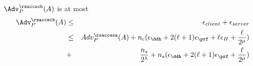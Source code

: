 \begin{lemma} \label{lemma:quic_tls_rsacce-cb}
 $\Adv^{\rsaccecb}_{P}(A)$ is at most
 \begin{eqnarray}
  \Adv^{\rsaccecb}_{P}(A) &\leq& \epsilon_{client} + \epsilon_{server} \nonumber \\
  &\leq& Adv^{\rsaccesa}_{P}(A) + n_c(\epsilon_{\ddh} + 2(\ell + 1)\epsilon_{\prf} + \ell\epsilon_{H} + \frac{\ell}{2^{\mu}}) \nonumber \\
   &+& \frac{n_s}{2^{\lambda}} + n_s(\epsilon_{\ddh} + 2(\ell+1)\epsilon_{\prf} + \frac{\ell}{2^{\mu}})
 \end{eqnarray}
\end{lemma}
%
